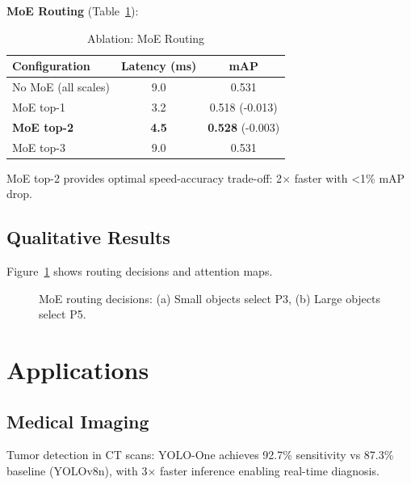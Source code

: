 \documentclass[conference]{IEEEtran}
\begin{document}
\textbf{MoE Routing} (Table~\ref{tab:ablation_moe}):

\begin{table}[h]
\centering
\caption{Ablation: MoE Routing}
\label{tab:ablation_moe}
\begin{tabular}{@{}lcc@{}}
\toprule
\textbf{Configuration} & \textbf{Latency (ms)} & \textbf{mAP} \\ \midrule
No MoE (all scales)    & 9.0                   & 0.531 \\
MoE top-1              & 3.2                   & 0.518 (-0.013) \\
\textbf{MoE top-2}     & \textbf{4.5}          & \textbf{0.528} (-0.003) \\
MoE top-3              & 9.0                   & 0.531 \\ \bottomrule
\end{tabular}
\end{table}

MoE top-2 provides optimal speed-accuracy trade-off: 2$\times$ faster with <1\% mAP drop.

\subsection{Qualitative Results}

Figure~\ref{fig:qualitative} shows routing decisions and attention maps.

\begin{figure}[t]
\centering
{}
\caption{MoE routing decisions: (a) Small objects select P3, (b) Large objects select P5.}
\label{fig:qualitative}
\end{figure}


\section{Applications}

\subsection{Medical Imaging}

Tumor detection in CT scans: YOLO-One achieves 92.7\% sensitivity vs 87.3\% baseline (YOLOv8n), with 3$\times$ faster inference enabling real-time diagnosis.
\end{document}
